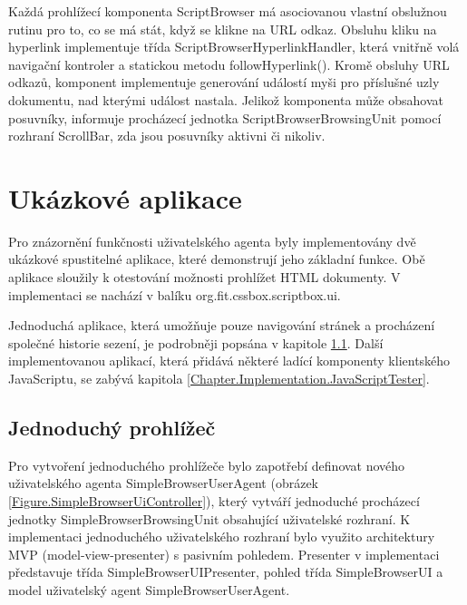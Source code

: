 Každá prohlížecí komponenta ScriptBrowser má asociovanou vlastní obslužnou rutinu pro to, co se má stát, když se klikne na URL odkaz. Obsluhu kliku na hyperlink implementuje třída ScriptBrowserHyperlinkHandler, která vnitřně volá navigační kontroler a statickou metodu followHyperlink(). Kromě obsluhy URL odkazů, komponent implementuje generování událostí myši pro příslušné uzly dokumentu, nad kterými událost nastala. Jelikož komponenta může obsahovat posuvníky, informuje procházecí jednotka ScriptBrowserBrowsingUnit pomocí rozhraní ScrollBar, zda jsou posuvníky aktivni či nikoliv.

\section{Ukázkové aplikace}
\label{Chapter.Implementation.DemoApplications}

Pro znázornění funkčnosti uživatelského agenta byly implementovány dvě ukázkové spustitelné aplikace, které demonstrují jeho základní funkce. Obě aplikace sloužily k otestování možnosti prohlížet HTML dokumenty. V implementaci se nachází v balíku org.fit.cssbox.scriptbox.ui.

Jednoduchá aplikace, která umožňuje pouze navigování stránek a procházení společné historie sezení, je podrobněji popsána v kapitole \ref{Chapter.Implementation.SimpleBrowser}. Další implementovanou aplikací, která přidává některé ladící komponenty klientského JavaScriptu, se zabývá kapitola \ref{Chapter.Implementation.JavaScriptTester}.  

\subsection{Jednoduchý prohlížeč}
\label{Chapter.Implementation.SimpleBrowser}

Pro vytvoření jednoduchého prohlížeče bylo zapotřebí definovat nového uživatelského agenta SimpleBrowserUserAgent (obrázek \ref{Figure.SimpleBrowserUiController}), který vytváří jednoduché procházecí jednotky SimpleBrowserBrowsingUnit obsahující uživatelské rozhraní. K implementaci jednoduchého uživatelského rozhraní bylo využito architektury MVP (model-view-presenter) s pasivním pohledem. Presenter v implementaci představuje třída SimpleBrowserUIPresenter, pohled třída SimpleBrowserUI a model uživatelský agent SimpleBrowserUserAgent.


